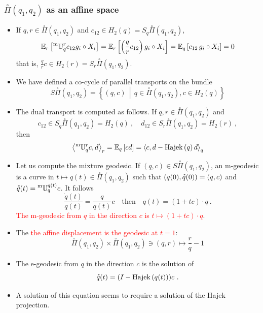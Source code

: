\documentclass[xcolor=svgnames]{beamer}
\DeclareMathOperator{\Hajek}{Hajek}
\newcommand{\expectat}[2]{\mathbb E_{#1}\left[#2\right]}
\newcommand{\hajekof}[1]{\Hajek\left(#1\right)}
\newcommand{\mtransport}[2]{\prescript{\text{m}}{} {\mathbb U} _ {#1} ^ {#2}}
\newcommand{\openplan}[2]{\overset{\circ}\Pi\left(#1,#2\right)}
\newcommand{\rosso}[1]{\textcolor{red}{#1}}
\newcommand{\scalarat}[3]{\left\langle#2,#3\right\rangle_{#1}}
\newcommand{\setof}[2]{\left\{#1 \, \middle| \, #2 \right\}}
\newcommand{\velocity}[1]{\accentset{\star}{#1}}
\renewcommand{\emph}{\rosso}
\begin{document}
\begin{frame}\small\frametitle{$\openplan{q_1}{q_2}$ as an affine space}
\begin{itemize}
\item If $q , r \in \openplan {q_1} {q_2}$ and $c_{12} \in H_2(q) = S_q \openplan {q_1}{q_2}$,
\begin{equation*}
\expectat r {\mtransport q r c_{12} g_i \circ X_i} = \expectat r {\left(\frac q r c_{12}\right) g_i \circ X_i} = \expectat q {c_{12} \,  g_i \circ X_i} = 0
\end{equation*}
that is, $\frac q r c \in H_2(r) = S_r \openplan {q_1}{q_2}$.
\item We have defined a co-cycle 
of parallel transports on the bundle
\begin{equation*}
    S \openplan {q_1}{q_2} = \setof {(q,c)}{ q \in \openplan {q_1}{q_2}, c \in H_2(q)} 
\end{equation*}
\item The dual transport is computed as follows. If $q, r \in \openplan {q_1}{q_2}$ and
\begin{equation*}
  c_{12} \in S_q \openplan {q_1}{q_2} = H_2(q) \ , \quad 
  d_{12} \in S_r \openplan {q_1}{q_2} = H_2(r) \ ,
\end{equation*}
then
\begin{equation*}
\scalarat r {\mtransport q r c} d = \expectat q {cd} = \scalarat q c {d - \hajekof q d}
\end{equation*}
\item Let us compute the mixture geodesic. If $(q,c) \in S \openplan {q_1}{q_2}$, an m-geodesic is a curve in $t \mapsto q(t) \in \openplan {q_1}{q_2}$ such that $(q(0),\velocity q(0)) = (q,c)$ and $\velocity q(t) = \mtransport q {q(t)} c$. It follows
\begin{equation*}
    \frac {\dot q(t)}{q(t)} = \frac q {q(t)} c \quad \text{then} \quad q(t) = (1 +tc) \cdot q \ .
\end{equation*}
\emph{The m-geodesic from $q$ in the direction $c$ is $t \mapsto (1+tc)\cdot q$}. 
\item The \emph{the affine displacement is the geodesic at $t=1$}:
\begin{equation*}
 \openplan {q_1}{q_2} \times  \openplan {q_1}{q_2} \ni (q,r) \mapsto \frac r q - 1
\end{equation*}
\item The e-geodesic from $q$ in the direction $c$ is the solution of
\begin{equation*}
\velocity q(t) = (I - \hajekof{q(t)})c \ .
\end{equation*}
\item A solution of this equation seems to require a solution of the Hajek projection.
\end{itemize}

\end{frame}
\end{document}
